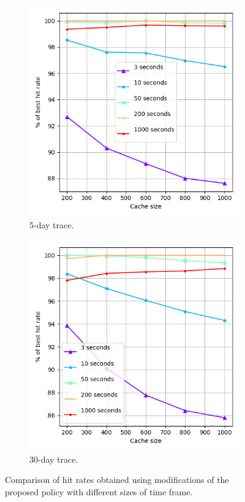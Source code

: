 \begin{figure}[t!]
	\centering
	\captionsetup{justification=centering}
	\begin{subfigure}[b]{0.49\linewidth}
		\includegraphics[width=\linewidth]{pics/cache6.png}
		\caption{5-day trace.}
	\end{subfigure}
	\begin{subfigure}[b]{0.49\linewidth}
		\includegraphics[width=\linewidth]{pics/cache6_2.png}
		\caption{30-day trace.}
	\end{subfigure}
	\caption{Comparison of hit rates obtained using modifications of the proposed policy with different sizes of time frame.}
	\label{fig:cache6}
\end{figure}


